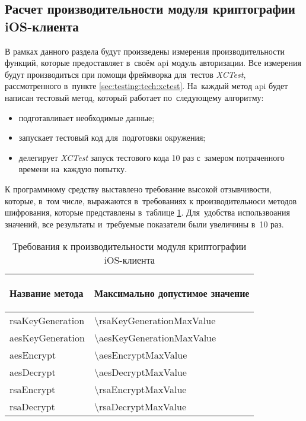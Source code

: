 \subsection{Расчет производительности модуля криптографии iOS-клиента}
\label{sec:eng:performance}

В рамках данного раздела будут произведены измерения производительности функций, которые предоставляет в~своём \gls{api} модуль авторизации. Все измерения будут производиться при помощи фреймворка для~тестов \textit{XCTest}, рассмотренного в~пункте \ref{sec:testing:tech:xctest}. На~каждый метод \gls{api} будет написан тестовый метод, который работает по~следующему алгоритму:

\begin{itemize}
	\item подготавливает необходимые данные;
	\item запускает тестовый код для~подготовки окружения;
	\item делегирует \textit{XCTest} запуск тестового кода 10 раз с~замером потраченного времени на~каждую попытку.
\end{itemize}

К программному средству выставлено требование высокой отзывчивости, которые, в~том числе, выражаются в~требованиях к производительноси методов шифрования, которые представлены в~таблице \ref{sec:eng:performance:aesenc:expected}. Для~удобства использвоания значений, все результаты и~требуемые показатели были увеличины в~10 раз.


\newcommand{\perfDev}{\text{П}_\text{о}}
\newcommand{\perfLimit}{\text{П}_\text{пд}}
\newcommand{\perfMax}{\text{П}_\text{макс}}
\newcommand{\perfMin}{\text{П}_\text{мин}}
\newcommand{\perfAverage}{\text{П}_\text{ср}}

\begin{table}[!ht]
  \caption{Требования к производительности модуля криптографии iOS-клиента}
  \label{sec:eng:performance:aesenc:expected}
  \centering
  \begin{tabularx}{\linewidth}{
    |>{\hsize=1.4\hsize}X|
    >{\centering\arraybackslash\hsize=0.6\hsize}X|
  }
  \hline
 \begin{center}Название метода\end{center} & Максимально допустимое значение \\
 \hline
 rsaKeyGeneration & \num{\rsaKeyGenerationMaxValue} \\
 \hline
 aesKeyGeneration & \num{\aesKeyGenerationMaxValue} \\
 \hline
 aesEncrypt & \num{\aesEncryptMaxValue} \\
 \hline
 aesDecrypt & \num{\aesDecryptMaxValue} \\
 \hline
 rsaEncrypt & \num{\rsaEncryptMaxValue} \\
 \hline
 rsaDecrypt & \num{\rsaDecryptMaxValue} \\
 \hline
  \end{tabularx}
\end{table}

